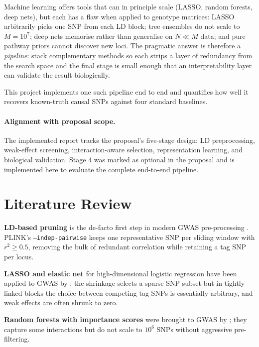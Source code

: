 \documentclass[11pt,a4paper]{article}
\begin{document}
Machine learning offers tools that can in principle scale (LASSO, random
forests, deep nets), but each has a flaw when applied to genotype
matrices: LASSO arbitrarily picks one SNP from each LD block; tree
ensembles do not scale to $M = 10^7$; deep nets memorise rather than
generalise on $N \ll M$ data; and pure pathway priors cannot discover new
loci. The pragmatic answer is therefore a \emph{pipeline}: stack
complementary methods so each strips a layer of redundancy from the search
space and the final stage is small enough that an interpretability layer
can validate the result biologically.

This project implements one such pipeline end to end and quantifies how
well it recovers known-truth causal SNPs against four standard baselines.

\paragraph{Alignment with proposal scope.} The implemented report tracks the
proposal's five-stage design: LD preprocessing, weak-effect screening,
interaction-aware selection, representation learning, and biological
validation. Stage 4 was marked as optional in the proposal and is implemented
here to evaluate the complete end-to-end pipeline.

\section{Literature Review}

\textbf{LD-based pruning} is the de-facto first step in modern GWAS
pre-processing \cite{purcell07}. PLINK's \texttt{--indep-pairwise} keeps
one representative SNP per sliding window with $r^2 \geq 0.5$, removing
the bulk of redundant correlation while retaining a tag SNP per locus.

\textbf{LASSO and elastic net} for high-dimensional logistic regression
\cite{tibshirani96} have been applied to GWAS by \cite{wu09}; the
shrinkage selects a sparse SNP subset but in tightly-linked blocks the
choice between competing tag SNPs is essentially arbitrary, and weak
effects are often shrunk to zero.

\textbf{Random forests with importance scores} were brought to GWAS by
\cite{goldstein10}; they capture some interactions but do not scale to
$10^6$ SNPs without aggressive pre-filtering.
\end{document}
